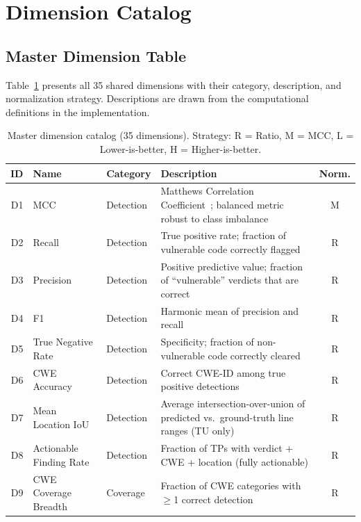 \documentclass[10pt,twocolumn]{article}
\begin{document}
\section{Dimension Catalog}
\label{sec:catalog}

\subsection{Master Dimension Table}

Table~\ref{tab:master_dims} presents all 35 shared dimensions with their category, description, and normalization strategy. Descriptions are drawn from the computational definitions in the implementation.

\begin{table}[!htbp]
\centering
\caption{Master dimension catalog (35 dimensions). Strategy: R = Ratio, M = MCC, L = Lower-is-better, H = Higher-is-better.}
\label{tab:master_dims}
\footnotesize
\begin{tabular}{@{}r l l p{6.2cm} c@{}}
\toprule
\textbf{ID} & \textbf{Name} & \textbf{Category} & \textbf{Description} & \textbf{Norm.} \\
\midrule
D1  & MCC                        & Detection & Matthews Correlation Coefficient~\citep{matthews1975mcc,chicco2020mcc}; balanced metric robust to class imbalance & M \\
D2  & Recall                     & Detection & True positive rate; fraction of vulnerable code correctly flagged & R \\
D3  & Precision                  & Detection & Positive predictive value; fraction of ``vulnerable'' verdicts that are correct & R \\
D4  & F1                         & Detection & Harmonic mean of precision and recall & R \\
D5  & True Negative Rate         & Detection & Specificity; fraction of non-vulnerable code correctly cleared & R \\
D6  & CWE Accuracy               & Detection & Correct CWE-ID among true positive detections & R \\
D7  & Mean Location IoU          & Detection & Average intersection-over-union of predicted vs.\ ground-truth line ranges (TU only) & R \\
D8  & Actionable Finding Rate    & Detection & Fraction of TPs with verdict + CWE + location (fully actionable) & R \\
\midrule
D9  & CWE Coverage Breadth       & Coverage & Fraction of CWE categories with $\geq$1 correct detection & R \\

\end{tabular}
\end{table}
\end{document}
